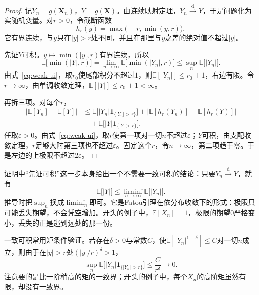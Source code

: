 \begin{proof}
记$Y_n=g(\bm{X}_n)$，$Y=g(\bm{X})$。由连续映射定理，$Y_n\xrightarrow{\mathrm{d}}Y$，于是问题化为实随机变量。对$r>0$，令截断函数
\[
 h_r(y)=\max\bigl(-r,\min(y,r)\bigr) ,
\]
它有界连续，与$y$只在$\lvert y\rvert>r$处不同，并且在那里与$y$之差的绝对值不超过$\lvert y\rvert$。

先证$Y$可积。$y\mapsto\min(\lvert y\rvert,r)$有界连续，所以
\[
 \mathbb{E}\bigl[\min(\lvert Y\rvert,r)\bigr]=\lim_{n\to\infty}\mathbb{E}\bigl[\min(\lvert Y_n\rvert,r)\bigr]\leq\sup_{n}\mathbb{E}\bigl[\lvert Y_n\rvert\bigr] .
\]
由式~\eqref{eq:weak-ui}，取$r_0$使尾部积分不超过$1$，则$\mathbb{E}[\lvert Y_n\rvert]\leq r_0+1$，右边有限。令$r\to\infty$，由单调收敛定理，$\mathbb{E}[\lvert Y\rvert]\leq r_0+1<\infty$。

再拆三项。对每个$r$，
\[
 \begin{aligned}
 \bigl\lvert\mathbb{E}[Y_n]-\mathbb{E}[Y]\bigr\rvert
 &\leq\mathbb{E}\bigl[\lvert Y_n\rvert\mathbf{1}_{\{\lvert Y_n\rvert>r\}}\bigr]+\bigl\lvert\mathbb{E}[h_r(Y_n)]-\mathbb{E}[h_r(Y)]\bigr\rvert\\
 &\quad+\mathbb{E}\bigl[\lvert Y\rvert\mathbf{1}_{\{\lvert Y\rvert>r\}}\bigr] .
 \end{aligned}
\]
任取$\varepsilon>0$。由式~\eqref{eq:weak-ui}，取$r$使第一项对一切$n$不超过$\varepsilon$；$Y$可积，由支配收敛定理，$r$足够大时第三项也不超过$\varepsilon$。固定这个$r$，令$n\to\infty$，第二项趋于零。于是左边的上极限不超过$2\varepsilon$。
\end{proof}

证明中“先证可积”这一步本身给出一个不需要一致可积的结论：只要$Y_n\xrightarrow{\mathrm{d}}Y$，就有
\begin{equation}
 \mathbb{E}\bigl[\lvert Y\rvert\bigr]\leq\liminf_{n\to\infty}\mathbb{E}\bigl[\lvert Y_n\rvert\bigr] .
 \label{eq:weak-fatou}
\end{equation}
推导时把$\sup_n$换成$\liminf_n$即可。它是Fatou引理在依分布收敛下的形式：极限只可能丢失期望，不会凭空增加。开头的例子中，$\mathbb{E}[X_n]=1$，极限的期望$0$严格变小，丢失的正是逃到远处的那一份。

一致可积常用矩条件验证。若存在$\delta>0$与常数$C$，使$\mathbb{E}[\lvert Y_n\rvert^{1+\delta}]\leq C$对一切$n$成立，则由于在$\lvert y\rvert>r$处$(\lvert y\rvert/r)^{\delta}>1$，
\[
 \sup_n\mathbb{E}\bigl[\lvert Y_n\rvert\mathbf{1}_{\{\lvert Y_n\rvert>r\}}\bigr]\leq\frac{C}{r^{\delta}}\longrightarrow0 .
\]
注意要的是比一阶稍高的矩的一致界；开头的例子中，每个$X_n$的高阶矩虽然有限，却没有一致界。

